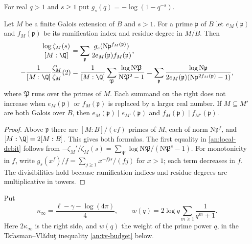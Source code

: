 For real $q>1$ and $s\ge1$ put $g_s(q)=-\log(1-q^{-s})$.

\begin{lemma}\label{an:local-contribution}
Let $M$ be a finite Galois extension of $B$ and $s>1$. For a prime
$\mathfrak p$ of $B$ let $e_M(\mathfrak p)$ and $f_M(\mathfrak p)$ be its
ramification index and residue degree in $M/B$. Then
\begin{align}
 \frac{\log\zeta_M(s)}{[M:\Q]}
 &=\sum_{\mathfrak p}\frac{g_s(\mathrm N\mathfrak p^{f_M(\mathfrak p)})}
 {2e_M(\mathfrak p)f_M(\mathfrak p)},\label{an:local-sum}\\
 -\frac1{[M:\Q]}\frac{\zeta_M'}{\zeta_M}(2)
 &=\frac1{[M:\Q]}\sum_{\mathfrak P}\frac{\log\mathrm N\mathfrak P}
 {\mathrm N\mathfrak P^2-1}
 =\sum_{\mathfrak p}\frac{\log\mathrm N\mathfrak p}
 {2e_M(\mathfrak p)(\mathrm N\mathfrak p^{2f_M(\mathfrak p)}-1)},
 \label{an:local-debit}
\end{align}
where $\mathfrak P$ runs over the primes of $M$. Each summand on the right
does not increase when $e_M(\mathfrak p)$ or $f_M(\mathfrak p)$ is replaced
by a larger real number. If $M\subseteq M'$ are both Galois over $B$, then
$e_M(\mathfrak p)\mid e_{M'}(\mathfrak p)$ and
$f_M(\mathfrak p)\mid f_{M'}(\mathfrak p)$.
\end{lemma}

\begin{proof}
Above $\mathfrak p$ there are $[M:B]/(ef)$ primes of $M$, each of norm
$\mathrm N\mathfrak p^f$, and $[M:\Q]=2[M:B]$. This gives both formulas.
The first equality in \eqref{an:local-debit} follows from
$-\zeta_M'/\zeta_M(s)=\sum_{\mathfrak P}\log\mathrm N\mathfrak P/(\mathrm
N\mathfrak P^s-1)$. For monotonicity in $f$, write
$g_s(x^f)/f=\sum_{j\ge1}x^{-fjs}/(fj)$ for $x>1$; each term decreases in
$f$. The divisibilities hold because ramification indices and residue
degrees are multiplicative in towers.
\end{proof}

Put
\[
 \kappa_\infty=\frac{\ell-\gamma-\log(4\pi)}4,\qquad
 w(q)=2\log q\sum_{m\ge1}\frac1{q^m+1}.
\]
Here $2\kappa_\infty$ is the right side, and $w(q)$ the weight of the prime
power $q$, in the Tsfasman--Vl\u{a}du\c{t} inequality \eqref{an:tv-budget}
below.

